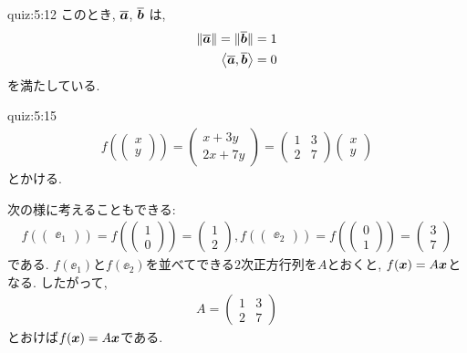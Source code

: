 \begin{answerof}{quiz:5:12}
  このとき, $\overline{\boldsymbol{a}}$, $\overline{\boldsymbol{b}}$
  は,
  \begin{align*}
    \|\overline{\boldsymbol{a}}\|=\|\overline{\boldsymbol{b}}\|=1\\
    \Braket{\overline{\boldsymbol{a}},\overline{\boldsymbol{b}}}=0
  \end{align*}
  を満たしている.
\end{answerof}


\begin{answerof}{quiz:5:15}
  \begin{align*}
    f(\begin{pmatrix}x\\y\end{pmatrix})
      =\begin{pmatrix}x+3y\\2x+7y\end{pmatrix}
      =\begin{pmatrix}1&3\\2&7\end{pmatrix}\begin{pmatrix}x\\y\end{pmatrix}
  \end{align*}
  とかける.


  次の様に考えることもできる:
  \begin{align*}
    f(\begin{pmatrix}\ee_1\end{pmatrix})
    =f(\begin{pmatrix}1\\0\end{pmatrix})
    =\begin{pmatrix}1\\2\end{pmatrix},
    f(\begin{pmatrix}\ee_2\end{pmatrix})
    =f(\begin{pmatrix}0\\1\end{pmatrix})
    =\begin{pmatrix}3\\7\end{pmatrix}
  \end{align*}
  である.
  $f(\ee_1)$と$f(\ee_2)$を並べてできる$2$次正方行列を$A$とおくと,
  $f(\boldsymbol{x})=A\boldsymbol{x}$となる.
  したがって,
  \begin{align*}
    A=\begin{pmatrix}1&3\\2&7\end{pmatrix}
  \end{align*}
  とおけば$f(\boldsymbol{x})=A\boldsymbol{x}$である.
\end{answerof}
